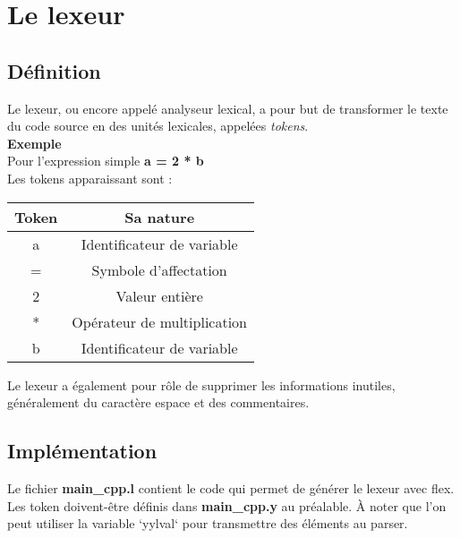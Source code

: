 \documentclass[a4paper]{article}
\begin{document}
\clearpage{}

\section{Le lexeur}

\subsection{Définition}

 Le lexeur, ou encore appelé analyseur lexical, a pour but de transformer le texte du code source en des unités lexicales, appelées \textit{tokens}. \\
 
    \textbf{Exemple} \\
    Pour l'expression simple \textbf{a = 2 * b} \\
    Les tokens apparaissant sont : \\
    \begin{center}
    \begin{tabular}{ | c | c | }
    \hline
    \textbf{Token} & \textbf{Sa nature} \\ 
    \hline
    a & Identificateur de variable \\ 
    \hline
    = & Symbole d'affectation \\  
    \hline
    2 & Valeur entière \\
    \hline
    * & Opérateur de multiplication \\
    \hline
    b & Identificateur de variable \\
    \hline
\end{tabular}
\end{center}

Le lexeur a également pour rôle de supprimer les informations inutiles, généralement du caractère espace et des commentaires.

\subsection{Implémentation}

Le fichier \textbf{main\_cpp.l} contient le code qui permet de générer le lexeur avec flex. Les token doivent-être définis dans \textbf{main\_cpp.y} au préalable.
À noter que l'on peut utiliser la variable `yylval` pour transmettre des
éléments au parser.

\end{document}
